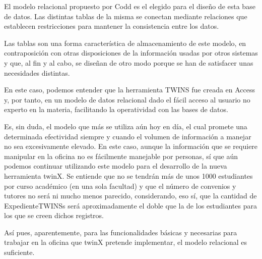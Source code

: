 El modelo relacional propuesto por Codd es el elegido para el diseño de esta base de datos. Las distintas tablas de la misma se conectan mediante relaciones que establecen restricciones para mantener la consistencia entre los datos.

Las tablas son una forma característica de almacenamiento de este modelo, en contraposición con otras disposiciones de la información usadas por otros sistemas y que, al fin y al cabo, se diseñan de otro modo porque se han de satisfacer unas necesidades distintas.

En este caso, podemos entender que la herramienta TWINS fue creada en Access y, por tanto, en un modelo de datos relacional dado el fácil acceso al usuario no experto en la materia, facilitando la operatividad con las bases de datos.

Es, sin duda, el modelo que más se utiliza aún hoy en día, el cual promete una determinada efectividad siempre y cuando el volumen de información a manejar no sea excesivamente elevado. En este caso, aunque la información que se requiere manipular en la oficina no es fácilmente manejable por personas, sí que aún podemos continuar utilizando este modelo para el desarrollo de la nueva herramienta twinX. Se entiende que no se tendrán más de unos 1000 estudiantes por curso académico (en una sola facultad) y que el número de convenios y tutores no será ni mucho menos parecido, considerando, eso sí, que la cantidad de \glspl{ExpedienteTWINS} será aproximadamente el doble que la de los estudiantes para los que se creen dichos registros.

Así pues, aparentemente, para las funcionalidades básicas y necesarias para trabajar en la oficina que twinX pretende implementar, el modelo relacional es suficiente.

